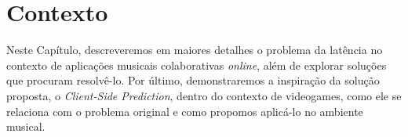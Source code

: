 \chapter{Contexto}
\label{chap:context}

Neste Capítulo, descreveremos em maiores detalhes o problema da latência no contexto de aplicações musicais colaborativas \textit{online}, além de explorar soluções que procuram resolvê-lo. Por último, demonstraremos a inspiração da solução proposta, o \textit{Client-Side Prediction}, dentro do contexto de videogames, como ele se relaciona com o problema original e como propomos aplicá-lo no ambiente musical.
